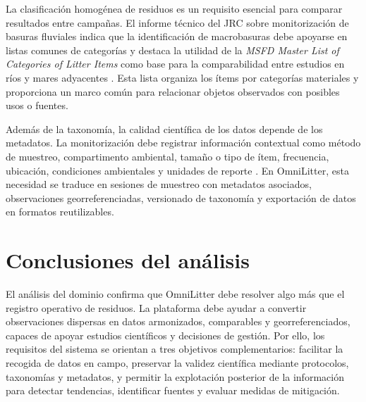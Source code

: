 La clasificación homogénea de residuos es un requisito esencial para comparar
resultados entre campañas. El informe técnico del JRC sobre monitorización de
basuras fluviales indica que la identificación de macrobasuras debe apoyarse en
listas comunes de categorías y destaca la utilidad de la \textit{MSFD Master List
of Categories of Litter Items} como base para la comparabilidad entre estudios en
ríos y mares adyacentes \cite{gonzalez2016riverine}. Esta lista organiza los
ítems por categorías materiales y proporciona un marco común para relacionar
objetos observados con posibles usos o fuentes.

Además de la taxonomía, la calidad científica de los datos depende de los
metadatos. La monitorización debe registrar información contextual como método de
muestreo, compartimento ambiental, tamaño o tipo de ítem, frecuencia, ubicación,
condiciones ambientales y unidades de reporte \cite{gonzalez2016riverine}. En
OmniLitter, esta necesidad se traduce en sesiones de muestreo con metadatos
asociados, observaciones georreferenciadas, versionado de taxonomía y exportación
de datos en formatos reutilizables.

\section{Conclusiones del análisis}

El análisis del dominio confirma que OmniLitter debe resolver algo más que el
registro operativo de residuos. La plataforma debe ayudar a convertir
observaciones dispersas en datos armonizados, comparables y georreferenciados,
capaces de apoyar estudios científicos y decisiones de gestión. Por ello, los
requisitos del sistema se orientan a tres objetivos complementarios: facilitar la
recogida de datos en campo, preservar la validez científica mediante protocolos,
taxonomías y metadatos, y permitir la explotación posterior de la información para
detectar tendencias, identificar fuentes y evaluar medidas de mitigación.
